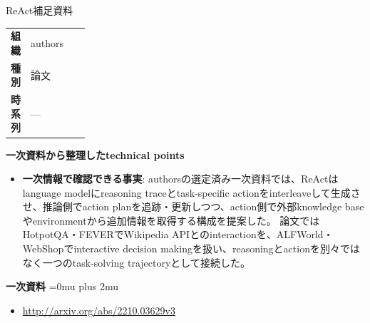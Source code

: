 \begin{technicalnote}{ReAct}{補足資料}
\begingroup
\begin{tabularx}{\linewidth}{@{}>{\bfseries}p{0.22\linewidth}X@{}}
組織 & authors \\
種別 & 論文 \\
時系列 & — \\
\end{tabularx}
\smallskip
{\bfseries 一次資料から整理したtechnical points}
\begin{itemize}[leftmargin=1.5em,itemsep=0.35em]
\item \textbf{一次情報で確認できる事実}: authorsの選定済み一次資料では、ReActはlanguage modelにreasoning traceとtask-specific actionをinterleaveして生成させ、推論側でaction planを追跡・更新しつつ、action側で外部knowledge baseやenvironmentから追加情報を取得する構成を提案した。 論文ではHotpotQA・FEVERでWikipedia APIとのinteractionを、ALFWorld・WebShopでinteractive decision makingを扱い、reasoningとactionを別々ではなく一つのtask-solving trajectoryとして接続した。
\end{itemize}
\begin{minipage}{\linewidth}
\begin{samepage}
{\bfseries 一次資料}
\begingroup\sloppy
\Urlmuskip=0mu plus 2mu\relax
\begin{itemize}[leftmargin=1.5em,itemsep=0.25em]
\item {\scriptsize\url{http://arxiv.org/abs/2210.03629v3}}
\end{itemize}
\endgroup
\end{samepage}
\end{minipage}
\endgroup
\end{technicalnote}
\medskip

